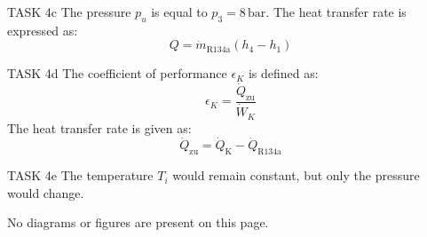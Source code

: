 TASK 4c  
The pressure \( p_u \) is equal to \( p_3 = 8 \, \text{bar} \).  
The heat transfer rate is expressed as:  
\[
Q = \dot{m}_{\text{R134a}} (h_4 - h_1)
\]  

TASK 4d  
The coefficient of performance \( \epsilon_K \) is defined as:  
\[
\epsilon_K = \frac{\dot{Q}_{\text{zu}}}{\dot{W}_K}
\]  
The heat transfer rate is given as:  
\[
\dot{Q}_{\text{zu}} = \dot{Q}_{\text{K}} - \dot{Q}_{\text{R134a}}
\]  

TASK 4e  
The temperature \( T_i \) would remain constant, but only the pressure would change.  

No diagrams or figures are present on this page.